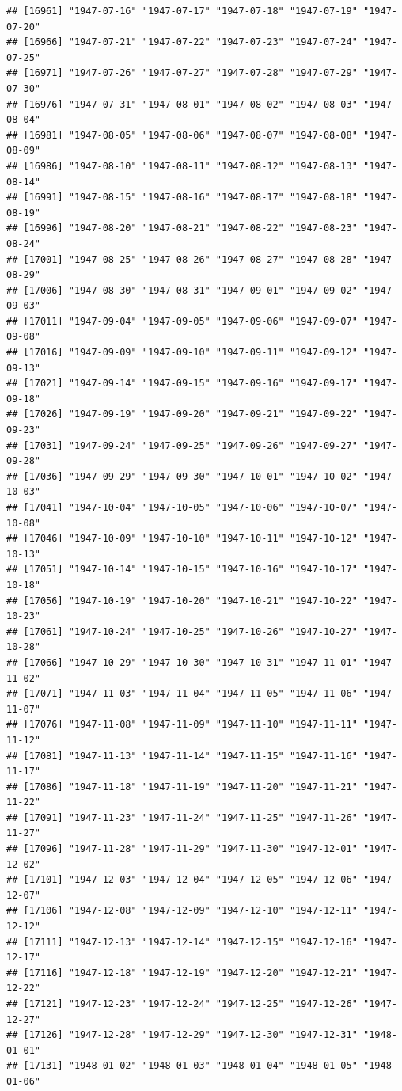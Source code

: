 \documentclass{article}\usepackage[]{graphicx}\usepackage[]{color}
\makeatletter
\newenvironment{kframe}{%
 \def\at@end@of@kframe{}%
 \ifinner\ifhmode%
  \def\at@end@of@kframe{\end{minipage}}%
  \begin{minipage}{\columnwidth}%
 \fi\fi%
 \def\FrameCommand##1{\hskip\@totalleftmargin \hskip-\fboxsep
 \colorbox{shadecolor}{##1}\hskip-\fboxsep
     \hskip-\linewidth \hskip-\@totalleftmargin \hskip\columnwidth}%
 \MakeFramed {\advance\hsize-\width
   \@totalleftmargin\z@ \linewidth\hsize
   \@setminipage}}%
 {\par\unskip\endMakeFramed%
 \at@end@of@kframe}
\newenvironment{knitrout}{}{} %
\makeatother
\begin{document}
\begin{description}
\begin{knitrout}
\begin{kframe}
\begin{verbatim}
## [16961] "1947-07-16" "1947-07-17" "1947-07-18" "1947-07-19" "1947-07-20"
## [16966] "1947-07-21" "1947-07-22" "1947-07-23" "1947-07-24" "1947-07-25"
## [16971] "1947-07-26" "1947-07-27" "1947-07-28" "1947-07-29" "1947-07-30"
## [16976] "1947-07-31" "1947-08-01" "1947-08-02" "1947-08-03" "1947-08-04"
## [16981] "1947-08-05" "1947-08-06" "1947-08-07" "1947-08-08" "1947-08-09"
## [16986] "1947-08-10" "1947-08-11" "1947-08-12" "1947-08-13" "1947-08-14"
## [16991] "1947-08-15" "1947-08-16" "1947-08-17" "1947-08-18" "1947-08-19"
## [16996] "1947-08-20" "1947-08-21" "1947-08-22" "1947-08-23" "1947-08-24"
## [17001] "1947-08-25" "1947-08-26" "1947-08-27" "1947-08-28" "1947-08-29"
## [17006] "1947-08-30" "1947-08-31" "1947-09-01" "1947-09-02" "1947-09-03"
## [17011] "1947-09-04" "1947-09-05" "1947-09-06" "1947-09-07" "1947-09-08"
## [17016] "1947-09-09" "1947-09-10" "1947-09-11" "1947-09-12" "1947-09-13"
## [17021] "1947-09-14" "1947-09-15" "1947-09-16" "1947-09-17" "1947-09-18"
## [17026] "1947-09-19" "1947-09-20" "1947-09-21" "1947-09-22" "1947-09-23"
## [17031] "1947-09-24" "1947-09-25" "1947-09-26" "1947-09-27" "1947-09-28"
## [17036] "1947-09-29" "1947-09-30" "1947-10-01" "1947-10-02" "1947-10-03"
## [17041] "1947-10-04" "1947-10-05" "1947-10-06" "1947-10-07" "1947-10-08"
## [17046] "1947-10-09" "1947-10-10" "1947-10-11" "1947-10-12" "1947-10-13"
## [17051] "1947-10-14" "1947-10-15" "1947-10-16" "1947-10-17" "1947-10-18"
## [17056] "1947-10-19" "1947-10-20" "1947-10-21" "1947-10-22" "1947-10-23"
## [17061] "1947-10-24" "1947-10-25" "1947-10-26" "1947-10-27" "1947-10-28"
## [17066] "1947-10-29" "1947-10-30" "1947-10-31" "1947-11-01" "1947-11-02"
## [17071] "1947-11-03" "1947-11-04" "1947-11-05" "1947-11-06" "1947-11-07"
## [17076] "1947-11-08" "1947-11-09" "1947-11-10" "1947-11-11" "1947-11-12"
## [17081] "1947-11-13" "1947-11-14" "1947-11-15" "1947-11-16" "1947-11-17"
## [17086] "1947-11-18" "1947-11-19" "1947-11-20" "1947-11-21" "1947-11-22"
## [17091] "1947-11-23" "1947-11-24" "1947-11-25" "1947-11-26" "1947-11-27"
## [17096] "1947-11-28" "1947-11-29" "1947-11-30" "1947-12-01" "1947-12-02"
## [17101] "1947-12-03" "1947-12-04" "1947-12-05" "1947-12-06" "1947-12-07"
## [17106] "1947-12-08" "1947-12-09" "1947-12-10" "1947-12-11" "1947-12-12"
## [17111] "1947-12-13" "1947-12-14" "1947-12-15" "1947-12-16" "1947-12-17"
## [17116] "1947-12-18" "1947-12-19" "1947-12-20" "1947-12-21" "1947-12-22"
## [17121] "1947-12-23" "1947-12-24" "1947-12-25" "1947-12-26" "1947-12-27"
## [17126] "1947-12-28" "1947-12-29" "1947-12-30" "1947-12-31" "1948-01-01"
## [17131] "1948-01-02" "1948-01-03" "1948-01-04" "1948-01-05" "1948-01-06"

\end{verbatim}
\end{kframe}
\end{knitrout}
\end{description}
\end{document}
